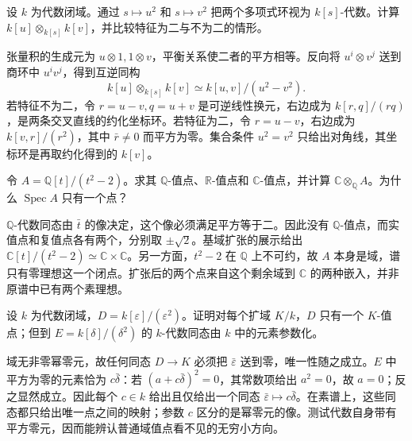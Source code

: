\begin{exercise}\label{b3:ex:07-tensor-square-map}
	设 \(k\) 为代数闭域。通过 \(s\mapsto u^2\) 和 \(s\mapsto v^2\) 把两个多项式环视为 \(k[s]\)-代数。计算 \(k[u]\otimes_{k[s]}k[v]\)，并比较特征为二与不为二的情形。
\end{exercise}
\begin{solution}
	张量积的生成元为 \(u\otimes1,1\otimes v\)，平衡关系使二者的平方相等。反向将 \(u^i\otimes v^j\) 送到商环中 \(u^iv^j\)，得到互逆同构
	\[
		k[u]\otimes_{k[s]}k[v]\simeq k[u,v]/(u^2-v^2).
	\]
	若特征不为二，令 \(r=u-v,q=u+v\) 是可逆线性换元，右边成为 \(k[r,q]/(rq)\)，是两条交叉直线的约化坐标环。若特征为二，令 \(r=u-v\)，右边成为 \(k[v,r]/(r^2)\)，其中 \(\bar r\ne0\) 而平方为零。集合条件 \(u^2=v^2\) 只给出对角线，其坐标环是再取约化得到的 \(k[v]\)。
\end{solution}

\begin{exercise}\label{b3:ex:07-rational-closed-point}
	令 \(A=\mathbb Q[t]/(t^2-2)\)。求其 \(\mathbb Q\)-值点、\(\mathbb R\)-值点和 \(\mathbb C\)-值点，并计算 \(\mathbb C\otimes_{\mathbb Q}A\)。为什么 \(\operatorname{Spec}A\) 只有一个点？
\end{exercise}
\begin{solution}
	\(\mathbb Q\)-代数同态由 \(\bar t\) 的像决定，这个像必须满足平方等于二。因此没有 \(\mathbb Q\)-值点，而实值点和复值点各有两个，分别取 \(\pm\sqrt2\)。基域扩张的展示给出 \(\mathbb C[t]/(t^2-2)\simeq\mathbb C\times\mathbb C\)。另一方面，\(t^2-2\) 在 \(\mathbb Q\) 上不可约，故 \(A\) 本身是域，谱只有零理想这一个闭点。扩张后的两个点来自这个剩余域到 \(\mathbb C\) 的两种嵌入，并非原谱中已有两个素理想。
\end{solution}

\begin{exercise}\label{b3:ex:07-dual-number-valued-points}
	设 \(k\) 为代数闭域，\(D=k[\varepsilon]/(\varepsilon^2)\)。证明对每个扩域 \(K/k\)，\(D\) 只有一个 \(K\)-值点；但到 \(E=k[\delta]/(\delta^2)\) 的 \(k\)-代数同态由 \(k\) 中的元素参数化。
\end{exercise}
\begin{solution}
	域无非零幂零元，故任何同态 \(D\to K\) 必须把 \(\bar\varepsilon\) 送到零，唯一性随之成立。\(E\) 中平方为零的元素恰为 \(c\bar\delta\)：若 \((a+c\bar\delta)^2=0\)，其常数项给出 \(a^2=0\)，故 \(a=0\)；反之显然成立。因此每个 \(c\in k\) 给出且仅给出一个同态 \(\bar\varepsilon\mapsto c\bar\delta\)。在素谱上，这些同态都只给出唯一点之间的映射；参数 \(c\) 区分的是幂零元的像。测试代数自身带有平方零元，因而能辨认普通域值点看不见的无穷小方向。
\end{solution}

